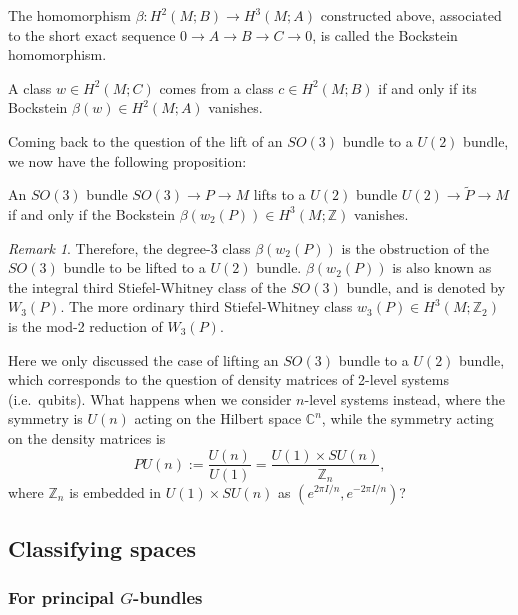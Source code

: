 \documentclass[12pt]{article}
\numberwithin{equation}{section}
\theoremstyle{remark}
\newtheorem{remark}[definition]{Remark}
\def\bC{\mathbb{C}}
\def\bZ{\mathbb{Z}}
\begin{document}
\begin{definition}
  The homomorphism $\beta:H^2(M;B)\to H^3(M;A)$
  constructed above, associated to the short exact sequence $0\to A\to B\to C\to 0$,
  is called the Bockstein homomorphism.
\end{definition}

\begin{proposition}
  A class $w\in H^2(M;C)$ comes from a class $c\in H^2(M;B)$
  if and only if its Bockstein $\beta(w)\in H^2(M;A)$ vanishes.
\end{proposition}

Coming back to the question of the lift of an $SO(3)$ bundle to a $U(2)$ bundle,
we now have the following proposition:
\begin{proposition}
  An $SO(3)$ bundle $SO(3)\to P\to M$
  lifts to a $U(2)$ bundle $U(2)\to \tilde P\to M$ if and only if
  the Bockstein $\beta(w_2(P))\in H^3(M;\bZ)$ vanishes.
\end{proposition}

\begin{remark}
Therefore, the degree-3 class $\beta(w_2(P))$ 
is the obstruction of the $SO(3)$ bundle to be lifted to a $U(2)$ bundle.
$\beta(w_2(P))$ is also known as the integral third Stiefel-Whitney class of the $SO(3)$ bundle, 
and is denoted by $W_3(P)$.
The more ordinary third Stiefel-Whitney class $w_3(P)\in H^3(M;\bZ_2)$ is the mod-2 reduction of $W_3(P)$.
\end{remark}

\begin{question}
Here we only discussed the case of lifting an $SO(3)$ bundle to a $U(2)$ bundle,
which corresponds to the question of density matrices of 2-level systems (i.e.~qubits).
What happens when we consider $n$-level systems instead,
where the symmetry is $U(n)$ acting on the Hilbert space $\bC^n$,
while the symmetry acting on the density matrices is \begin{equation}
PU(n):=\frac{U(n)}{U(1)} = \frac{U(1)\times SU(n)}{\bZ_n},
\end{equation}where $\bZ_n$ is embedded in $U(1)\times SU(n)$ as $(e^{2\pi I/n},e^{-2\pi I/n})$?
\end{question}

\subsection{Classifying spaces}
\subsubsection{For principal $G$-bundles}
\end{document}
